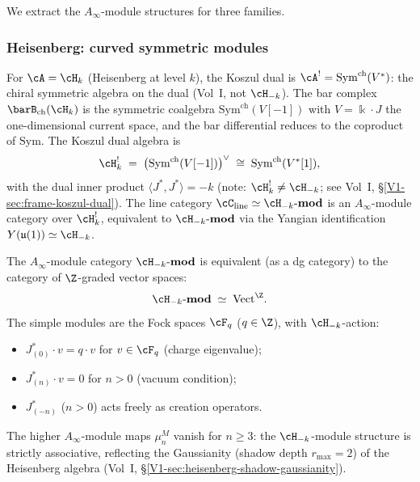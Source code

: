 We extract the $A_\infty$-module structures for three
families.

\subsubsection{Heisenberg: curved symmetric modules}

For $\cA=\cH_k$ (Heisenberg at level $k$),
the Koszul dual is $\cA^!=\mathrm{Sym}^{\mathrm{ch}}(V^*)$:
the chiral symmetric algebra on the dual (Vol~I, not $\cH_{-k}$). The bar complex
$\barB_{\mathrm{ch}}(\cH_k)$ is the symmetric coalgebra
$\mathrm{Sym}^{\mathrm{ch}}(V[-1])$ with $V=\Bbbk\cdot J$
the one-dimensional current space, and the bar differential
reduces to the coproduct of $\mathrm{Sym}$. The Koszul
dual algebra is
\[
\cH_k^!
\;=\;
\bigl(\mathrm{Sym}^{\mathrm{ch}}(V[-1])\bigr)^\vee
\;\cong\;
\mathrm{Sym}^{\mathrm{ch}}(V^*[1]),
\]
with the dual inner product $\langle J^*,J^*\rangle=-k$
(note: $\cH_k^! \neq \cH_{-k}$; see Vol~I, \S\ref{V1-sec:frame-koszul-dual}).
The line category $\cC_{\mathrm{line}} \simeq \cH_{-k}\text{-}\mathbf{mod}$
is an $A_\infty$-module category over $\cH_k^!$,
equivalent to $\cH_{-k}\text{-}\mathbf{mod}$
via the Yangian identification $Y(\mathfrak{u}(1)) \simeq \cH_{-k}$.

\begin{proposition}
The $A_\infty$-module category
$\cH_{-k}\text{-}\mathbf{mod}$ is equivalent (as a
dg category) to the category of $\Z$-graded vector spaces:
\begin{equation}
\cH_{-k}\text{-}\mathbf{mod}
\;\simeq\;
\mathrm{Vect}^\Z.
\end{equation}
The simple modules are the Fock spaces
$\cF_q$ ($q\in\Z$), with $\cH_{-k}$-action:
\begin{itemize}
\item $J^*_{(0)}\cdot v=q\cdot v$ for $v\in\cF_q$
 (charge eigenvalue);
\item $J^*_{(n)}\cdot v=0$ for $n>0$ (vacuum condition);
\item $J^*_{(-n)}$ ($n>0$) acts freely as creation operators.
\end{itemize}
The higher $A_\infty$-module maps $\mu_n^M$ vanish
for $n\ge 3$: the $\cH_{-k}$-module structure is
strictly associative, reflecting the Gaussianity
(shadow depth $r_{\max}=2$) of the Heisenberg algebra
(Vol~I, \S\ref*{V1-sec:heisenberg-shadow-gaussianity}).
\end{proposition}

